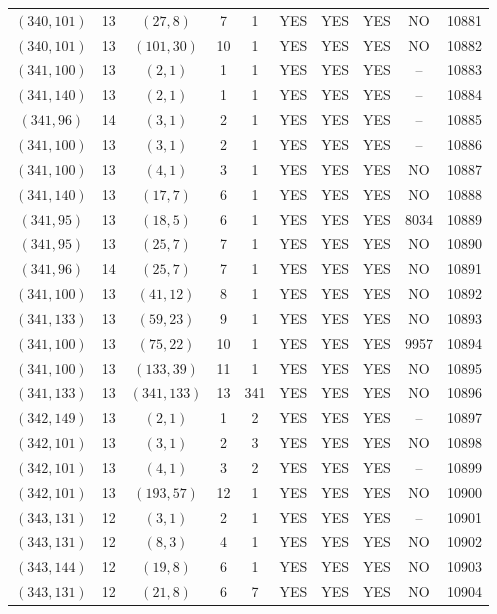 \begin{longtable}{|c|c|c|c|c|c|c|c|c|c|}
$(340, 101)$ & 13 & $(27, 8)$ & 7 & 1 & YES & YES & YES & NO & 10881\\
$(340, 101)$ & 13 & $(101, 30)$ & 10 & 1 & YES & YES & YES & NO & 10882\\
$(341, 100)$ & 13 & $(2, 1)$ & 1 & 1 & YES & YES & YES & -- & 10883\\
$(341, 140)$ & 13 & $(2, 1)$ & 1 & 1 & YES & YES & YES & -- & 10884\\
$(341, 96)$ & 14 & $(3, 1)$ & 2 & 1 & YES & YES & YES & -- & 10885\\
$(341, 100)$ & 13 & $(3, 1)$ & 2 & 1 & YES & YES & YES & -- & 10886\\
$(341, 100)$ & 13 & $(4, 1)$ & 3 & 1 & YES & YES & YES & NO & 10887\\
$(341, 140)$ & 13 & $(17, 7)$ & 6 & 1 & YES & YES & YES & NO & 10888\\
$(341, 95)$ & 13 & $(18, 5)$ & 6 & 1 & YES & YES & YES & 8034 & 10889\\
$(341, 95)$ & 13 & $(25, 7)$ & 7 & 1 & YES & YES & YES & NO & 10890\\
$(341, 96)$ & 14 & $(25, 7)$ & 7 & 1 & YES & YES & YES & NO & 10891\\
$(341, 100)$ & 13 & $(41, 12)$ & 8 & 1 & YES & YES & YES & NO & 10892\\
$(341, 133)$ & 13 & $(59, 23)$ & 9 & 1 & YES & YES & YES & NO & 10893\\
$(341, 100)$ & 13 & $(75, 22)$ & 10 & 1 & YES & YES & YES & 9957 & 10894\\
$(341, 100)$ & 13 & $(133, 39)$ & 11 & 1 & YES & YES & YES & NO & 10895\\
$(341, 133)$ & 13 & $(341, 133)$ & 13 & 341 & YES & YES & YES & NO & 10896\\
$(342, 149)$ & 13 & $(2, 1)$ & 1 & 2 & YES & YES & YES & -- & 10897\\
$(342, 101)$ & 13 & $(3, 1)$ & 2 & 3 & YES & YES & YES & NO & 10898\\
$(342, 101)$ & 13 & $(4, 1)$ & 3 & 2 & YES & YES & YES & -- & 10899\\
$(342, 101)$ & 13 & $(193, 57)$ & 12 & 1 & YES & YES & YES & NO & 10900\\
$(343, 131)$ & 12 & $(3, 1)$ & 2 & 1 & YES & YES & YES & -- & 10901\\
$(343, 131)$ & 12 & $(8, 3)$ & 4 & 1 & YES & YES & YES & NO & 10902\\
$(343, 144)$ & 12 & $(19, 8)$ & 6 & 1 & YES & YES & YES & NO & 10903\\
$(343, 131)$ & 12 & $(21, 8)$ & 6 & 7 & YES & YES & YES & NO & 10904\\

\end{longtable}
